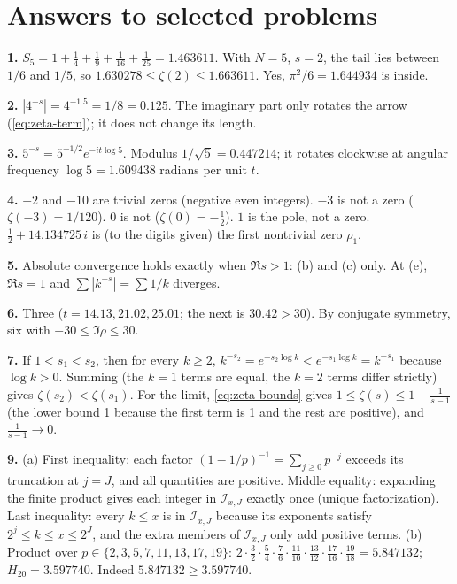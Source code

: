 \section{Answers to selected problems}\label{sec:zeta-answers}

\textbf{1.} $S_5=1+\frac14+\frac19+\frac1{16}+\frac1{25}=1.463611$. With $N=5$, $s=2$, the tail lies between $1/6$ and $1/5$, so $1.630278\le\zeta(2)\le1.663611$. Yes, $\pi^2/6=1.644934$ is inside.

\textbf{2.} $|4^{-s}|=4^{-1.5}=1/8=0.125$. The imaginary part only rotates the arrow (\cref{eq:zeta-term}); it does not change its length.

\textbf{3.} $5^{-s}=5^{-1/2}e^{-it\log5}$. Modulus $1/\sqrt5=0.447214$; it rotates clockwise at angular frequency $\log5=1.609438$ radians per unit $t$.

\textbf{4.} $-2$ and $-10$ are trivial zeros (negative even integers). $-3$ is not a zero ($\zeta(-3)=1/120$). $0$ is not ($\zeta(0)=-\tfrac12$). $1$ is the pole, not a zero. $\tfrac12+14.134725\,i$ is (to the digits given) the first nontrivial zero $\rho_1$.

\textbf{5.} Absolute convergence holds exactly when $\Re s>1$: (b) and (c) only. At (e), $\Re s=1$ and $\sum|k^{-s}|=\sum1/k$ diverges.

\textbf{6.} Three ($t=14.13, 21.02, 25.01$; the next is $30.42>30$). By conjugate symmetry, six with $-30\le\Im\rho\le30$.

\textbf{7.} If $1<s_1<s_2$, then for every $k\ge2$, $k^{-s_2}=e^{-s_2\log k}<e^{-s_1\log k}=k^{-s_1}$ because $\log k>0$. Summing (the $k=1$ terms are equal, the $k=2$ terms differ strictly) gives $\zeta(s_2)<\zeta(s_1)$. For the limit, \cref{eq:zeta-bounds} gives $1\le\zeta(s)\le1+\frac1{s-1}$ (the lower bound 1 because the first term is 1 and the rest are positive), and $\frac{1}{s-1}\to0$.

\textbf{9.} (a) First inequality: each factor $(1-1/p)^{-1}=\sum_{j\ge0}p^{-j}$ exceeds its truncation at $j=J$, and all quantities are positive. Middle equality: expanding the finite product gives each integer in $\mathcal{I}_{x,J}$ exactly once (unique factorization). Last inequality: every $k\le x$ is in $\mathcal{I}_{x,J}$ because its exponents satisfy $2^j\le k\le x\le2^J$, and the extra members of $\mathcal{I}_{x,J}$ only add positive terms. (b) Product over $p\in\{2,3,5,7,11,13,17,19\}$: $2\cdot\frac32\cdot\frac54\cdot\frac76\cdot\frac{11}{10}\cdot\frac{13}{12}\cdot\frac{17}{16}\cdot\frac{19}{18}=5.847132$; $H_{20}=3.597740$. Indeed $5.847132\ge3.597740$.


